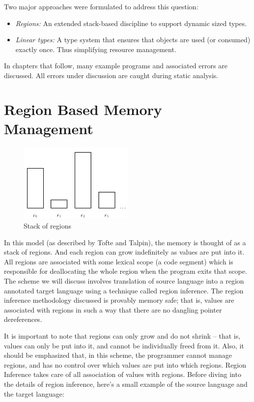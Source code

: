 \documentclass[11pt]{report}
\begin{document}
Two major approaches were formulated to address this question:

\begin{itemize}
\item \textit{Regions:} An extended stack-based discipline to support dynamic sized types.
\item \textit{Linear types:} A type system that ensures that objects are used (or consumed) exactly once. Thus simplifying resource management.
\end{itemize}

In chapters that follow, many example programs and associated errors are discussed. All errors under discussion are caught during static analysis.

\chapter{Region Based Memory Management}

\begin{figure}
\centering
\includegraphics[width=0.5\textwidth]{regions-blocks.png}
\caption{Stack of regions}
\end{figure}

In this model (as described by Tofte and Talpin\cite{tofterbmm}), the memory is thought of as a stack of regions. And each region can grow indefinitely as values are put into it. All regions are associated with some lexical scope (a code segment) which is responsible for deallocating the whole region when the program exits that scope. The scheme we will discuss involves translation of source language into a region annotated target language using a technique called region inference. The region inference methodology discussed is provably memory safe; that is, values are associated with regions in such a way that there are no dangling pointer dereferences.

It is important to note that regions can only grow and do not shrink -- that is, values can only be put into it, and cannot be individually freed from it. Also, it should be emphasized that, in this scheme, the programmer cannot manage regions, and has no control over which values are put into which regions. Region Inference takes care of all association of values with regions. Before diving into the details of region inference, here’s a small example of the source language and the target language:
\end{document}
